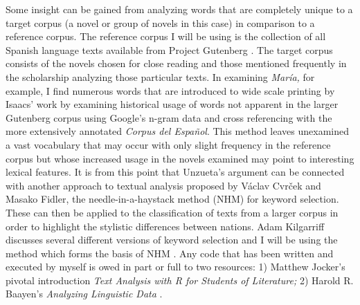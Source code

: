 \documentclass[12pt]{report}
\begin{document}
Some insight can be gained from analyzing words that are completely unique to a target corpus (a novel or group of novels in this case) in comparison to a reference corpus. The reference corpus I will be using is the collection of all Spanish language texts available from Project Gutenberg \autocite{Gutenberg2015}. 
The target corpus consists of the novels chosen for close reading and those mentioned frequently in the scholarship analyzing those particular texts. In examining \textit{María,} for example, I find numerous words that are introduced to wide scale printing by Isaacs' work by examining historical usage of words not apparent in the larger Gutenberg corpus using Google's n-gram data and cross referencing with the more extensively annotated \textit{Corpus del Español}\nocite{Michel2011, Davies2012}. 
This method leaves unexamined a vast vocabulary that may occur with only slight frequency in the reference corpus but whose increased usage in the novels examined may point to interesting lexical features. 
It is from this point that Unzueta's argument can be connected with another approach to textual analysis proposed by Václav Cvrček and Masako Fidler, the needle-in-a-haystack method (NHM) for keyword selection. 
These can then be applied to the classification of texts from a larger corpus in order to highlight the stylistic differences between nations. Adam Kilgarriff discusses several different versions of keyword selection and I will be using the method which forms the basis of NHM \nocite{Kilgarriff}. Any code that has been written and executed by myself is owed in part or full to two resources: 1) Matthew Jocker's pivotal introduction \textit{Text Analysis with R for Students of Literature;} 2) Harold R. Baayen's \textit{Analyzing Linguistic Data} \nocite{Jockers2014}\nocite{Baayen2008}. 



\end{document}
